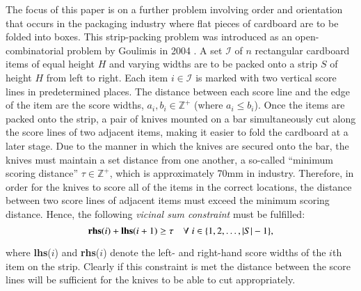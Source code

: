 \documentclass{elsarticle}
\begin{document}
The focus of this paper is on a further problem involving order and orientation that occurs in the packaging industry where flat pieces of cardboard are to be folded into boxes. This strip-packing problem was introduced as an open-combinatorial problem by Goulimis in 2004 \cite{goulimis2004}. A set $\mathcal{I}$ of $n$ rectangular cardboard items of equal height $H$ and varying widths are to be packed onto a strip $S$ of height $H$ from left to right. Each item $i \in \mathcal{I}$ is marked with two vertical score lines in predetermined places. The distance between each score line and the edge of the item are the score widths, $a_i, b_i \in \mathbb{Z}^+$ (where $a_i \leq b_i$). Once the items are packed onto the strip, a pair of knives mounted on a bar simultaneously cut along the score lines of two adjacent items, making it easier to fold the cardboard at a later stage. Due to the manner in which the knives are secured onto the bar, the knives must maintain a set distance from one another, a so-called ``minimum scoring distance'' $\tau \in \mathbb{Z}^+$, which is approximately 70mm in industry. Therefore, in order for the knives to score all of the items in the correct locations, the distance between two score lines of adjacent items must exceed the minimum scoring distance. Hence, the following \emph{vicinal sum constraint} must be fulfilled:
\begin{equation}
	\label{eqn:vsc}
	\textbf{rhs}(i) + \textbf{lhs}(i+1) \geq \tau \quad \forall \hspace{1mm} i \in \{1,2,\dotsc,|S|- 1\},
\end{equation}

\noindent where \textbf{lhs}($i$) and \textbf{rhs}($i$) denote the left- and right-hand score widths of the $i$th item on the strip. Clearly if this constraint is met the distance between the score lines will be sufficient for the knives to be able to cut appropriately.
\end{document}
